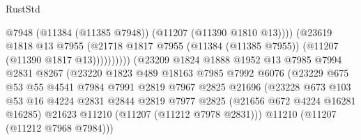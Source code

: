 \begin{lexlean}{RustStd}
\begin{coremodule}
                                              @7948
                                              (@11384 (@11385 @7948))
                                              (@11207 (@11390 @1810 @13))))
                                          (@23619
                                            @1818
                                            @13
                                            @7955
                                            (@21718
                                              @1817
                                              @7955
                                              (@11384 (@11385 @7955))
                                              (@11207 (@11390 @1817 @13))))))))))
                              (@23209
                                @1824
                                @1888
                                @1952
                                @13
                                @7985
                                @7994
                                @2831
                                @8267
                                (@23220
                                  @1823
                                  @489
                                  @18163
                                  @7985
                                  @7992
                                  @6076
                                  (@23229
                                    @675
                                    @53
                                    @55
                                    @4541
                                    @7984
                                    @7991
                                    @2819
                                    @7967
                                    @2825
                                    @21696
                                    (@23228
                                      @673
                                      @103
                                      @53
                                      @16
                                      @4224
                                      @2831
                                      @2844
                                      @2819
                                      @7977
                                      @2825
                                      (@21656 @672 @4224 @16281 @16285)
                                      @21623
                                      @11210
                                      (@11207 (@11212 @7978 @2831)))
                                    @11210
                                    (@11207 (@11212 @7968 @7984)))

\end{coremodule}
\end{lexlean}
